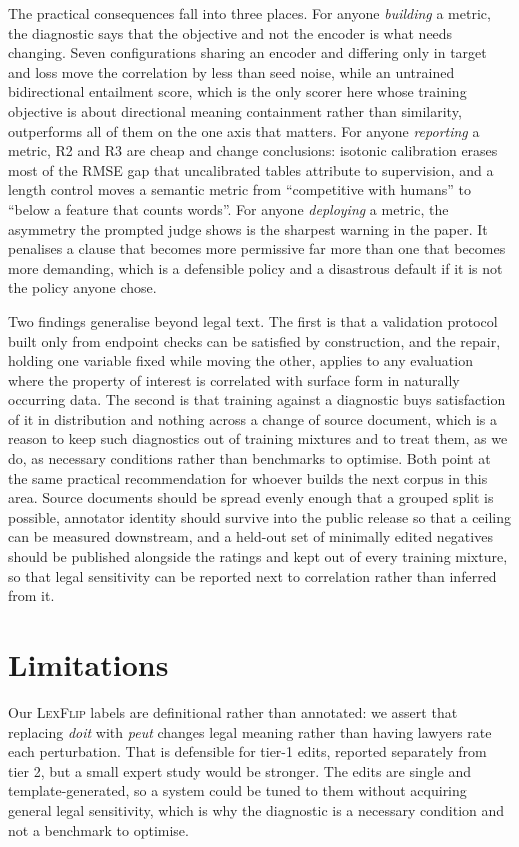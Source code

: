 \documentclass{BVP_JCLLT}
\begin{document}
The practical consequences fall into three places. For anyone \emph{building} a
metric, the diagnostic says that the objective and not the encoder is what needs
changing. Seven configurations sharing an encoder and differing only in target
and loss move the correlation by less than seed noise, while an untrained
bidirectional entailment score, which is the only scorer here whose training
objective is about directional meaning containment rather than similarity,
outperforms all of them on the one axis that matters. For anyone
\emph{reporting} a metric, R2 and R3 are cheap and change conclusions: isotonic
calibration erases most of the RMSE gap that uncalibrated tables attribute to
supervision, and a length control moves a semantic metric from ``competitive
with humans'' to ``below a feature that counts words''. For anyone
\emph{deploying} a metric, the asymmetry the prompted judge shows is the sharpest
warning in the paper. It penalises a clause that becomes more permissive far more
than one that becomes more demanding, which is a defensible policy and a
disastrous default if it is not the policy anyone chose.

Two findings generalise beyond legal text. The first is that a validation
protocol built only from endpoint checks can be satisfied by construction, and
the repair, holding one variable fixed while moving the other, applies to any
evaluation where the property of interest is correlated with surface form in
naturally occurring data. The second is that training against a diagnostic buys
satisfaction of it in distribution and nothing across a change of source
document, which is a reason to keep such diagnostics out of training mixtures
and to treat them, as we do, as necessary conditions rather than benchmarks to
optimise. Both point at the same practical recommendation for whoever builds the
next corpus in this area. Source documents should be spread evenly enough that a
grouped split is possible, annotator identity should survive into the public
release so that a ceiling can be measured downstream, and a held-out set of
minimally edited negatives should be published alongside the ratings and kept
out of every training mixture, so that legal sensitivity can be reported next to
correlation rather than inferred from it.

\section{Limitations}\label{sec:limits}

Our \textsc{LexFlip} labels are definitional rather than annotated: we assert
that replacing \emph{doit} with \emph{peut} changes legal meaning rather than
having lawyers rate each perturbation. That is defensible for tier-1 edits,
reported separately from tier 2, but a small expert study would be stronger. The
edits are single and template-generated, so a system could be tuned to them
without acquiring general legal sensitivity, which is why the diagnostic is a
necessary condition and not a benchmark to optimise.
\end{document}
